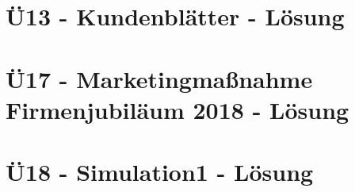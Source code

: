 \section{Ü13 - Kundenblätter - Lösung}\label{sec:U13-Kundenblaetter-Loesung}
\newpage

\section{Ü17 - Marketingmaßnahme Firmenjubiläum 2018 - Lösung}
\newpage

\section{Ü18 - Simulation1 - Lösung}
\newpage


